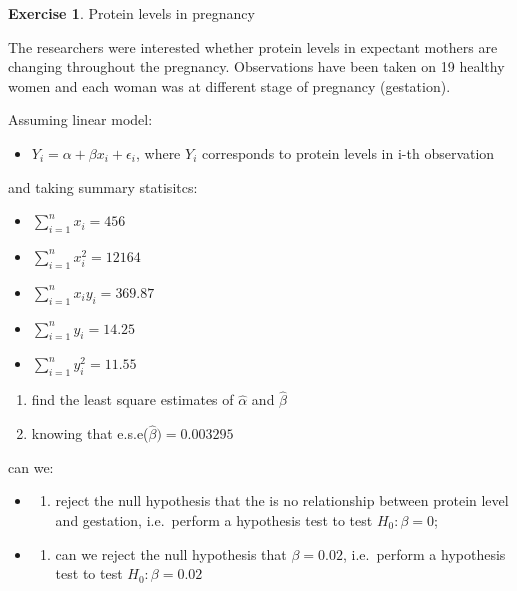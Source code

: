 \documentclass[
]{book}
\providecommand{\tightlist}{%
  \setlength{\itemsep}{0pt}\setlength{\parskip}{0pt}}
\theoremstyle{definition}
\theoremstyle{definition}
\theoremstyle{definition}
\newtheorem{exercise}{Exercise}[chapter]
\theoremstyle{remark}
\begin{document}
\begin{exercise}
\protect\hypertarget{exr:lm-protein}{}{\label{exr:lm-protein} }Protein levels in pregnancy

The researchers were interested whether protein levels in expectant mothers are changing throughout the pregnancy. Observations have been taken on 19 healthy women and each woman was at different stage of pregnancy (gestation).

Assuming linear model:

\begin{itemize}
\tightlist
\item
  \(Y_i = \alpha + \beta x_i + \epsilon_i\), where \(Y_i\) corresponds to protein levels in i-th observation
\end{itemize}

and taking summary statisitcs:

\begin{itemize}
\tightlist
\item
  \(\sum_{i=1}^{n}x_i = 456\)
\item
  \(\sum_{i=1}^{n}x_i^2 = 12164\)
\item
  \(\sum_{i=1}^{n}x_iy_i = 369.87\)
\item
  \(\sum_{i=1}^{n}y_i = 14.25\)
\item
  \(\sum_{i=1}^{n}y_i^2 = 11.55\)
\end{itemize}

\begin{enumerate}
\def\labelenumi{\alph{enumi})}
\tightlist
\item
  find the least square estimates of \(\hat{\alpha}\) and \(\hat{\beta}\)
\item
  knowing that e.s.e(\(\hat{\beta}) = 0.003295\)
\end{enumerate}

can we:

\begin{itemize}
\item
  \begin{enumerate}
  \def\labelenumi{\roman{enumi})}
  \tightlist
  \item
    reject the null hypothesis that the is no relationship between protein level and gestation, i.e.~perform a hypothesis test to test \(H_0:\beta = 0\);
  \end{enumerate}
\item
  \begin{enumerate}
  \def\labelenumi{\roman{enumi})}
  \setcounter{enumi}{1}
  \tightlist
  \item
    can we reject the null hypothesis that \(\beta = 0.02\), i.e.~perform a hypothesis test to test \(H_0:\beta = 0.02\)
  \end{enumerate}
\end{itemize}


\end{exercise}
\end{document}
